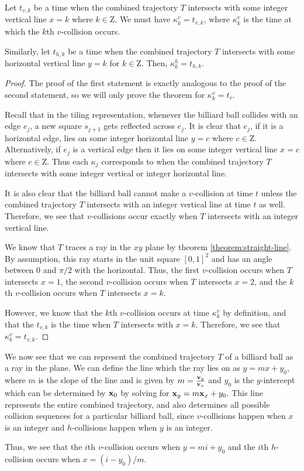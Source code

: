 \begin{theorem}
  Let $t_{v, k}$ be a time when the combined trajectory $T$ intersects with some integer vertical line $x = k$ where $k \in \mathrm{Z}$. We must have $\kappa^v_k = t_{v, k}$, where $\kappa^v_k$ is the time at which the $k$th $v$-collision occurs.

  Similarly, let $t_{h, k}$ be a time when the combined trajectory $T$ intersects with some horizontal vertical line $y = k$ for $k \in \mathrm{Z}$. Then, $\kappa^h_k = t_{h, k}$.
\end{theorem}
\begin{proof}
  The proof of the first statement is exactly analogous to the proof of the second statement, so we will only prove the theorem for $\kappa^v_k = t_v$.

  Recall that in the tiling representation, whenever the billiard ball collides with an edge $e_j$, a new square $s_{j+1}$ gets reflected across $e_j$. It is clear that $e_j$, if it is a horizontal edge, lies on some integer horizontal line $y = c$ where $c \in \mathrm{Z}$. Alternatively, if $e_j$ is a vertical edge then it lies on some integer vertical line $x = c$ where $c \in \mathrm{Z}$. Thus each $\kappa_j$ corresponds to when the combined trajectory $T$ intersects with some integer vertical or integer horizontal line.

  It is also clear that the billiard ball cannot make a $v$-collision at time $t$ unless the combined trajectory $T$ intersects with an integer vertical line at time $t$ as well. Therefore, we see that $v$-collisions occur exactly when $T$ intersects with an integer vertical line.

  We know that $T$ traces a ray in the $xy$ plane by theorem \ref{theorem:straight-line}. By assumption, this ray starts in the unit square $[0,1]^2$ and has an angle between $0$ and $\pi/2$ with the horizontal. Thus, the first $v$-collision occurs when $T$ intersects $x = 1$, the second $v$-collision occurs when $T$ intersects $x = 2$, and the $k$th $v$-collision occurs when $T$ intersects $x = k$.

  However, we know that the $k$th $v$-collision occurs at time $\kappa^v_{k}$ by definition, and that the $t_{v, k}$ is the time when $T$ intersects with $x = k$. Therefore, we see that $\kappa^v_{k} = t_{v, k}$.
\end{proof}

We now see that we can represent the combined trajectory $T$ of a billiard ball as a ray in the plane. We can define the line which the ray lies on as $y = mx + y_0$, where $m$ is the slope of the line and is given by $m = \frac{\mathbf{v}_y}{\mathbf{v}_x}$ and $y_0$ is the $y$-intercept which can be determined by $\mathbf{x}_0$ by solving for $\mathbf{x}_y = m \mathbf{x}_x + y_0$. This line represents the entire combined trajectory, and also determines all possible collision sequences for a particular billiard ball, since $v$-collisions happen when $x$ is an integer and $h$-collisions happen when $y$ is an integer.

Thus, we see that the $i$th $v$-collision occurs when $y = mi + y_0$ and the $i$th $h$-collision occurs when $x = (i - y_0) / m$.
